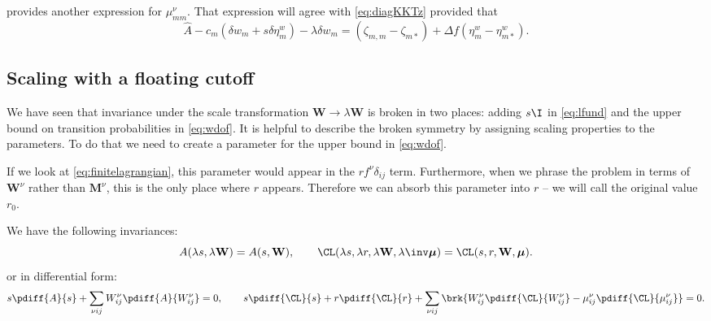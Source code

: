 \documentclass[12pt]{article}
\newcommand{\etwm}{\eta^w}
\newcommand{\dgnm}{\zeta}
\newcommand{\wm}{w}
\newcommand{\Wm}{W}
\newcommand{\W}{\mathbf{\Wm}}
\newcommand{\MMdm}{M}
\newcommand{\MMd}{\mathbf{\MMdm}}
\newcommand{\kktm}{\mu}
\newcommand{\kkt}{\boldsymbol{\kktm}}
\begin{document}
 provides another expression for \(\kktm^\nu_{mm}\).
That expression will agree with \cref{eq:diagKKTz} provided that
%
\begin{equation}\label{eq:diagAgree}
    \hat{A} - c_m (\delta \wm_m + s \delta \etwm_m)
      - \lambda \delta w_m 
      = (\dgnm_{m,m} - \dgnm_{m*}) 
        + \Delta f (\etwm_m - \etwm_{m*}).
\end{equation}
% 


\subsection{Scaling with a floating cutoff}\label{sec:cutoff}

We have seen that invariance under the scale transformation \(\W \to \lambda\W \) is broken in two places: adding \(s\I \) in \cref{eq:lfund} and the upper bound on transition probabilities in \cref{eq:wdof}.
It is helpful to describe the broken symmetry by assigning scaling properties to the parameters.
To do that we need to create a parameter for the upper bound in \cref{eq:wdof}.

If we look at \cref{eq:finitelagrangian}, this parameter would appear in the \(r f^\nu \delta_{ij}\) term.
Furthermore, when we phrase the problem in terms of \(\W^\nu \) rather than \(\MMd^\nu \), this is the only place where \(r\) appears.
Therefore we can absorb this parameter into \(r\) -- we will call the original value \(r_0\).

We have the following invariances:
%
\begin{equation*}
  A(\lambda s, \lambda \W) = A(s, \W),
  \qquad
  \CL(\lambda s, \lambda r, \lambda \W, \lambda\inv \kkt) = \CL(s, r, \W, \kkt).
\end{equation*}
%
or in differential form:
%
\begin{equation*}
  s \pdiff{A}{s} + \sum_{\nu i j} \Wm^\nu_{ij} \pdiff{A}{\Wm^\nu_{ij}} = 0,
  \qquad
  s \pdiff{\CL}{s} + r \pdiff{\CL}{r} 
    + \sum_{\nu i j} \brk{\Wm^\nu_{ij} \pdiff{\CL}{\Wm^\nu_{ij}} 
                      - \kktm^\nu_{ij} \pdiff{\CL}{\kktm^\nu_{ij}}} = 0.
\end{equation*}
%
\end{document}
